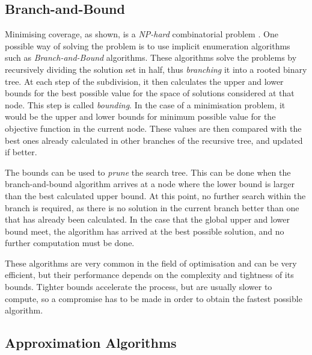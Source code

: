 \subsection{Branch-and-Bound}
Minimising coverage, as shown, is a \emph{NP-hard} combinatorial problem \cite{complex}. One possible way of solving the problem is to use implicit enumeration algorithms such as \emph{Branch-and-Bound} algorithms.
These algorithms solve the problems by recursively dividing the solution set in half, thus \emph{branching} it into a rooted binary tree.
At each step of the subdivision, it then calculates the upper and lower bounds for the best possible value for the space of solutions considered at that node. This step is called \emph{bounding}.
In the case of a minimisation problem, it would be the upper and lower bounds for minimum possible value for the objective function in the current node. These values are then compared with the best ones already calculated in other branches of the recursive tree, and updated if better.

The bounds can be used to \emph{prune} the search tree. This can be done when the branch-and-bound algorithm arrives at a node where the lower bound is larger than the best calculated upper bound. At this point, no further search within the branch is required, as there is no solution in the current branch better than one that has already been calculated. 
In the case that the global upper and lower bound meet, the algorithm has arrived at the best possible solution, and no further computation must be done.

These algorithms are very common in the field of optimisation and can be very efficient, but their performance depends on the complexity and tightness of its bounds. Tighter bounds accelerate the process, but are usually slower to compute, so a compromise has to be made in order to obtain the fastest possible algorithm.

\subsection{Approximation Algorithms}

\change{}

